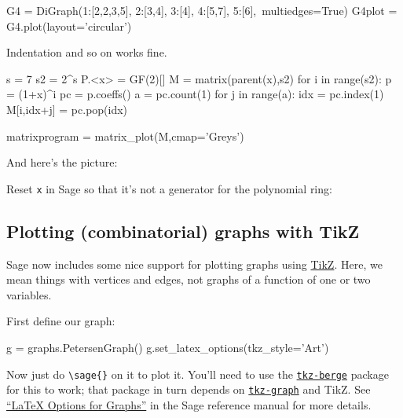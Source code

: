 \documentclass{article}
\begin{document}
\begin{center}
\end{center}


\begin{sageblock}
G4 = DiGraph({1:[2,2,3,5], 2:[3,4], 3:[4], 4:[5,7], 5:[6]},\
             multiedges=True)
G4plot = G4.plot(layout='circular')
\end{sageblock}


Indentation and so on works fine.
\begin{sageblock}
 s     = 7
 s2    = 2^s
 P.<x> = GF(2)[]
 M     = matrix(parent(x),s2)
 for i in range(s2):
    p  = (1+x)^i
    pc = p.coeffs()
    a  = pc.count(1)
    for j in range(a):
        idx        = pc.index(1)
        M[i,idx+j] = pc.pop(idx)

 matrixprogram = matrix_plot(M,cmap='Greys')
\end{sageblock}
And here's the picture:


Reset \texttt{x} in Sage so that it's not a generator for the polynomial
ring: \sage{var('x')}

\subsection{Plotting (combinatorial) graphs with TikZ}
\label{sec:plotting-graphs-with}

Sage now includes some nice support for plotting graphs using
\href{http://www.texample.net/tikz/}{TikZ}. Here, we mean things with
vertices and edges, not graphs of a function of one or two variables.

First define our graph:

\begin{sageblock}
  g = graphs.PetersenGraph()
  g.set_latex_options(tkz_style='Art')
\end{sageblock}

Now just do \verb|\sage{}| on it to plot it. You'll need to use the
\href{http://altermundus.com/pages/graphtheory.html}{\texttt{tkz-berge}}
package for this to work; that package in turn depends on
\href{http://altermundus.com/pages/graph.html}{\texttt{tkz-graph}} and
TikZ. See
\href{http://sagemath.org/doc/reference/sage/graphs/graph_latex.html}{``\LaTeX{}
  Options for Graphs''} in the Sage reference manual for more details.
\end{document}
